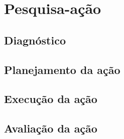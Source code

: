 \chapter{Pesquisa-ação}

\section{Diagnóstico}
\section{Planejamento da ação}
\section{Execução da ação}
\section{Avaliação da ação}